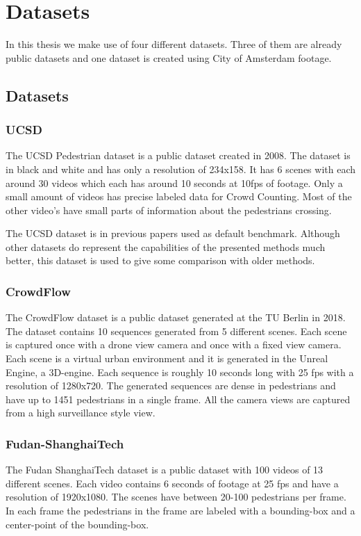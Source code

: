 \chapter{Datasets}
In this thesis we make use of four different datasets. Three of them are already public datasets and one dataset is created using City of Amsterdam footage.

\section{Datasets}

\subsection{UCSD}
The UCSD Pedestrian dataset \cite{Chan2008} is a public dataset created in 2008. The dataset is in black and white and has only a resolution of 234x158. It has 6 scenes with each around 30 videos which each has around 10 seconds at 10fps of footage. Only a small amount of videos has precise labeled data for Crowd Counting. Most of the other video's have small parts of information about the pedestrians crossing.

The UCSD dataset is in previous papers used as default benchmark. Although other datasets do represent the capabilities of the presented methods much better, this dataset is used to give some comparison with older methods.

\subsection{CrowdFlow}
The CrowdFlow dataset \cite{Schroder2019} is a public dataset generated at the TU Berlin in 2018. The dataset contains 10 sequences generated from 5 different scenes. Each scene is captured once with a drone view camera and once with a fixed view camera. Each scene is a virtual urban environment and it is generated in the Unreal Engine, a 3D-engine. Each sequence is roughly 10 seconds long with 25 fps with a resolution of 1280x720. The generated sequences are dense in pedestrians and have up to 1451 pedestrians in a single frame. All the camera views are captured from a high surveillance style view.

\subsection{Fudan-ShanghaiTech}
The Fudan ShanghaiTech dataset \cite{Fang2019} is a public dataset with 100 videos of 13 different scenes. Each video contains 6 seconds of footage at 25 fps and have a resolution of 1920x1080. The scenes have between 20-100 pedestrians per frame. In each frame the pedestrians in the frame are labeled with a bounding-box and a center-point of the bounding-box.

